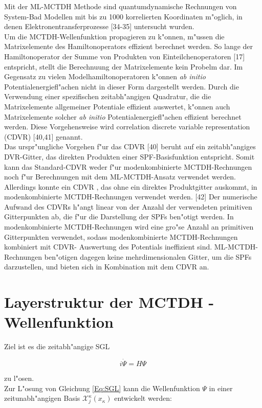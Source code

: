 Mit der ML-MCTDH Methode sind quantumdynamische Rechnungen von System-Bad Modellen mit bis zu 1000 korrelierten Koordinaten m"oglich,
in denen Elektronentransferprozesse [34-35] untersucht wurden.
 \\Um die MCTDH-Wellenfunktion propagieren zu k"onnen, m"ussen die Matrixelemente des Hamiltonoperators effizient berechnet werden.
So lange der Hamiltonoperator der Summe von Produkten von Einteilchenoperatoren [17] entspricht, stellt die Berechnuung der Matrixelemente kein Probelm dar.
Im Gegensatz zu vielen Modelhamiltonoperatoren k"onnen \textit{ab initio} Potentialenergiefl"achen nicht in dieser Form dargestellt werden.
Durch die Verwendung einer spezifischen zeitabh"angigen Quadratur, die die Matrixelemente allgemeiner Potentiale effizient auswertet, k"onnen
auch Matrixelemente solcher \textit{ab initio} Potentialenergiefl"achen effizient berechnet werden.
Diese Vorgehensweise wird correlation discrete variable representation (CDVR) [40,41] genannt.
 \\Das urspr"ungliche Vorgehen f"ur das CDVR [40] beruht auf ein zeitabh"angiges DVR-Gitter, das direkten Produkten einer SPF-Basisfunktion entspricht.
Somit kann das Standard-CDVR weder f"ur modenkombinierte MCTDH-Rechnungen noch f"ur Berechnungen mit dem ML-MCTDH-Ansatz verwendet werden.
 \\Allerdings konnte ein CDVR , das ohne ein direktes Produktgitter auskommt, in modenkombinierte MCTDH-Rechnungen verwendet werden. [42]
 Der numerische Aufwand des CDVRs h"angt linear von der Anzahl der verwendeten primitiven Gitterpunkten ab, die f"ur die Darstellung der SPFs ben"otigt werden.
In modenkombinierte MCTDH-Rechnungen wird eine gro"se Anzahl an primitiven Gitterpunkten verwendet, sodass modenkombinierte MCTDH-Rechnungen kombiniert mit CDVR-
Auswertung des Potentials ineffizient sind. ML-MCTDH-Rechnungen ben"otigen dagegen keine mehrdimensionalen Gitter, um die SPFs darzustellen, und bieten sich
in Kombination mit dem CDVR an.

\section{Layerstruktur der MCTDH - Wellenfunktion}

Ziel ist es die zeitabh"angige SGL

\begin{equation}
i\dot{\Psi} = H \Psi
\label{Eq:SGL}
\end{equation}

zu l"osen.
  \\Zur L"osung von Gleichung \ref{Eq:SGL} kann die Wellenfunktion $\Psi$ in einer zeitunabh"angigen Basis $\mathcal{X}^{\kappa}_{j}(x_{\kappa})$ entwickelt werden:

